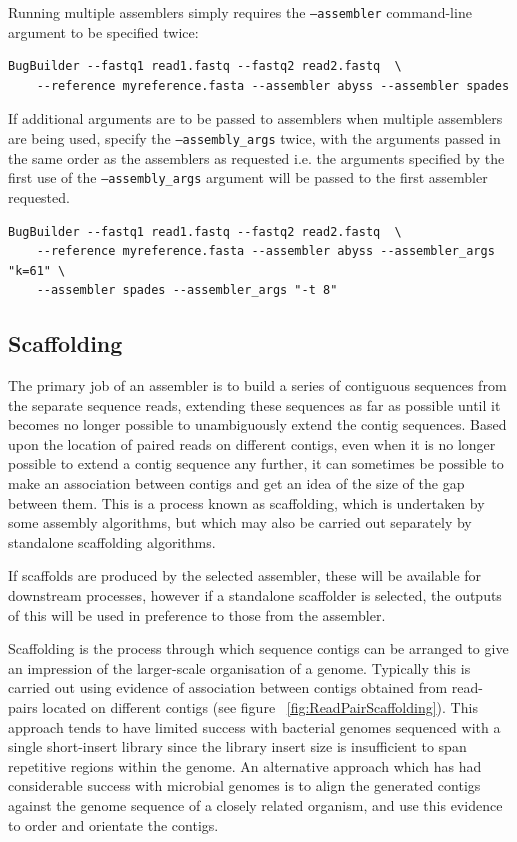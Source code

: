 \documentclass[a4paper,10pt]{article}
\begin{document}
Running multiple assemblers simply requires the {\tt --assembler} command-line argument to be
specified twice:

\begin{verbatim}
BugBuilder --fastq1 read1.fastq --fastq2 read2.fastq  \
    --reference myreference.fasta --assembler abyss --assembler spades
\end{verbatim}

If additional arguments are to be passed to assemblers when multiple assemblers are being used,
specify the {\tt --assembly\_args} twice, with the arguments passed in the same order as the
assemblers as requested i.e. the arguments specified by the first use of the {\tt --assembly\_args}
argument will be passed to the first assembler requested.

\begin{verbatim}
BugBuilder --fastq1 read1.fastq --fastq2 read2.fastq  \
    --reference myreference.fasta --assembler abyss --assembler_args "k=61" \
    --assembler spades --assembler_args "-t 8"
\end{verbatim}

\subsection{Scaffolding}

The primary job of an assembler is to build a series of contiguous sequences from the separate
sequence reads, extending these sequences as far as possible until it becomes no longer possible to
unambiguously extend the contig sequences. Based upon the location of paired reads on different
contigs, even when it is no longer possible to extend a contig sequence any further, it can
sometimes be possible to make an association between  contigs and get an idea of the size of the
gap between them. This is a process known as scaffolding, which is undertaken by some assembly
algorithms, but which may also be carried out separately by standalone scaffolding algorithms.

If scaffolds are produced by the selected assembler, these will be available for downstream
processes, however if a standalone scaffolder is selected, the outputs of this will be used in
preference to those from the assembler. 

Scaffolding is the process through which sequence contigs can be arranged to give an impression of
the larger-scale organisation of a genome. Typically this is carried out using evidence of
association between contigs obtained from read-pairs located on different contigs (see figure
~\ref{fig:ReadPairScaffolding}). This approach tends to have limited success with bacterial genomes
sequenced with a single short-insert library since the library insert size is insufficient to span
repetitive regions within the genome. An alternative approach which has had considerable success
with microbial genomes is to align the generated contigs against the genome sequence of a closely
related organism, and use this evidence to order and orientate the contigs.
\end{document}
